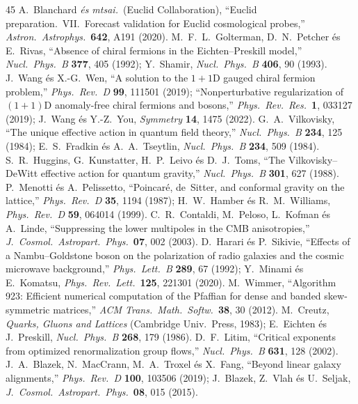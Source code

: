 \documentclass[11pt,a4paper]{article}
\begin{document}
\begin{thebibliography}{45}
 A.~Blanchard \textit{és mtsai.}\ (Euclid Collaboration), ``Euclid preparation.\ VII.\ Forecast validation for Euclid cosmological probes,'' \textit{Astron.\ Astrophys.}\ \textbf{642}, A191 (2020).
 M.~F.~L.~Golterman, D.~N.~Petcher és E.~Rivas, ``Absence of chiral fermions in the Eichten--Preskill model,'' \textit{Nucl.\ Phys.\ B} \textbf{377}, 405 (1992); Y.~Shamir, \textit{Nucl.\ Phys.\ B} \textbf{406}, 90 (1993).
 J.~Wang és X.-G.~Wen, ``A solution to the $1+1$D gauged chiral fermion problem,'' \textit{Phys.\ Rev.\ D} \textbf{99}, 111501 (2019); ``Nonperturbative regularization of $(1+1)$D anomaly-free chiral fermions and bosons,'' \textit{Phys.\ Rev.\ Res.}\ \textbf{1}, 033127 (2019); J.~Wang és Y.-Z.~You, \textit{Symmetry} \textbf{14}, 1475 (2022).
 G.~A.~Vilkovisky, ``The unique effective action in quantum field theory,'' \textit{Nucl.\ Phys.\ B} \textbf{234}, 125 (1984); E.~S.~Fradkin és A.~A.~Tseytlin, \textit{Nucl.\ Phys.\ B} \textbf{234}, 509 (1984).
 S.~R.~Huggins, G.~Kunstatter, H.~P.~Leivo és D.~J.~Toms, ``The Vilkovisky--DeWitt effective action for quantum gravity,'' \textit{Nucl.\ Phys.\ B} \textbf{301}, 627 (1988).
 P.~Menotti és A.~Pelissetto, ``Poincar\'e, de~Sitter, and conformal gravity on the lattice,'' \textit{Phys.\ Rev.\ D} \textbf{35}, 1194 (1987); H.~W.~Hamber és R.~M.~Williams, \textit{Phys.\ Rev.\ D} \textbf{59}, 064014 (1999).
 C.~R.~Contaldi, M.~Peloso, L.~Kofman és A.~Linde, ``Suppressing the lower multipoles in the CMB anisotropies,'' \textit{J.\ Cosmol.\ Astropart.\ Phys.}\ \textbf{07}, 002 (2003).
 D.~Harari és P.~Sikivie, ``Effects of a Nambu--Goldstone boson on the polarization of radio galaxies and the cosmic microwave background,'' \textit{Phys.\ Lett.\ B} \textbf{289}, 67 (1992); Y.~Minami és E.~Komatsu, \textit{Phys.\ Rev.\ Lett.}\ \textbf{125}, 221301 (2020).
 M.~Wimmer, ``Algorithm 923: Efficient numerical computation of the Pfaffian for dense and banded skew-symmetric matrices,'' \textit{ACM Trans.\ Math.\ Softw.}\ \textbf{38}, 30 (2012).
 M.~Creutz, \textit{Quarks, Gluons and Lattices} (Cambridge Univ.\ Press, 1983); E.~Eichten és J.~Preskill, \textit{Nucl.\ Phys.\ B} \textbf{268}, 179 (1986).
 D.~F.~Litim, ``Critical exponents from optimized renormalization group flows,'' \textit{Nucl.\ Phys.\ B} \textbf{631}, 128 (2002).
 J.~A.~Blazek, N.~MacCrann, M.~A.~Troxel és X.~Fang, ``Beyond linear galaxy alignments,'' \textit{Phys.\ Rev.\ D} \textbf{100}, 103506 (2019); J.~Blazek, Z.~Vlah és U.~Seljak, \textit{J.\ Cosmol.\ Astropart.\ Phys.}\ \textbf{08}, 015 (2015).

\end{thebibliography}
\end{document}

